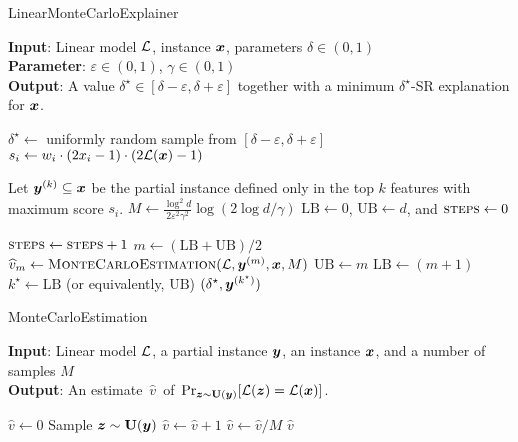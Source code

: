 
\begin{algorithm}[tb]
	\caption{LinearMonteCarloExplainer}
	\label{alg:algorithm}
	\textbf{Input}: Linear model $\mathcal{L}$, instance ${\bm{x}}$, parameters $\delta \in (0, 1)$\\
	\textbf{Parameter}:  $\varepsilon \in (0, 1)$,  $\gamma \in (0, 1)$\\
	\textbf{Output}: A value $\delta^\star \in [\delta-\varepsilon, \delta+\varepsilon]$ together with a minimum $\delta^\star$-SR explanation for ${\bm{x}}$.\\
	\begin{algorithmic}[1] %
	\STATE $\delta^\star \gets$ uniformly random sample from $[\delta-\varepsilon, \delta + \varepsilon]$ \label{line:delta}
		\STATE $s_i \gets  w_i \cdot (2x_i - 1) \cdot (2\mathcal{L}({\bm{x}}) - 1)$
	\ENDFOR
	
		\STATE  Let ${\bm{y}}^{(k)} \subseteq {\bm{x}}$ be the partial instance defined only in the top $k$ features with maximum score $s_i$.\label{line:greedy}
	\ENDFOR
	\STATE $M \gets \frac{\log^2{d}}{2\varepsilon^2 \gamma^2} \log(2 \log d / \gamma)$\label{line:mdef}
	\STATE $\textrm{LB} \gets 0$, $\textrm{UB} \gets d$, and $\textsc{steps} \gets 0$

	\label{line:while}
		\STATE $\textsc{steps} \gets \textsc{steps} + 1$\label{line:steps}
		\STATE $m \gets \left(\textrm{LB} + \textrm{UB} \right)/2$
		\STATE $\widehat{v}_m \gets \textsc{MonteCarloEstimation}(\mathcal{L}, {\bm{y}}^{(m)}, {\bm{x}}, M)$ \label{line:montecarlo}
			\STATE $\textrm{UB} \gets m$
		\ELSE
			\STATE $\textrm{LB} \gets (m+1)$
		\ENDIF
	\ENDWHILE\label{line:endwhile}
	\STATE $k^\star \gets \textrm{LB}$ (or equivalently, $\textrm{UB}$)
	\STATE \RETURN $(\delta^\star, {\bm{y}}^{(k^\star)})$
	\end{algorithmic}
	\end{algorithm}


\begin{algorithm}[tb]
	\caption{MonteCarloEstimation}	\label{alg:montecarlo}
	\textbf{Input}: Linear model $\mathcal{L}$, a partial instance ${\bm{y}}$, an instance ${\bm{x}}$, and a number of samples $M$\\
	\textbf{Output}: An estimate~$\widehat{v}$~of~$\Pr_{{\bm{z}} \sim \mathbf{U}({\bm{y}})}[\mathcal{L}({\bm{z}})=\mathcal{L}({\bm{x}})]$.\\
	\begin{algorithmic}[1]
	\STATE $\widehat{v} \gets 0$
		\STATE Sample ${\bm{z}} \sim \mathbf{U}({\bm{y}})$
		\IF {$\Lin(\vz) = \Lin(\vx)$}
			\STATE $\widehat{v} \gets \widehat{v} + 1$
		\ENDIF
	\ENDFOR
	\STATE $\widehat{v} \gets \widehat{v}/M$
	\STATE \RETURN $\widehat{v}$
\end{algorithmic}
\end{algorithm}


